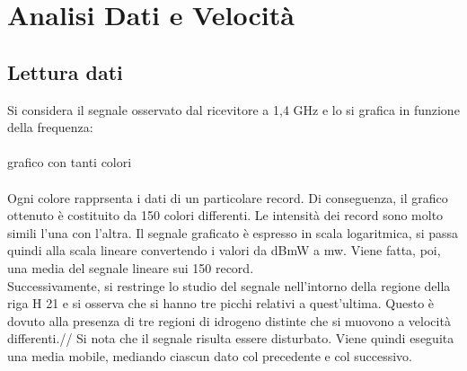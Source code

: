 \section{Analisi Dati e Velocità}
\label{Analisi Dati e Velocità}



\subsection{Lettura dati}
Si considera il segnale osservato dal ricevitore a 1,4 GHz e lo si grafica in funzione della frequenza:
\\\\
grafico con tanti colori
\\\\
Ogni colore rapprsenta i dati di un particolare record. Di conseguenza, il grafico ottenuto è costituito da 150 colori differenti. Le intensità dei record sono molto simili l'una con l'altra.
Il segnale graficato è espresso in scala logaritmica, si passa quindi alla scala lineare convertendo i valori da dBmW a mw. Viene fatta, poi, una media del segnale lineare sui 150 record.\\
Successivamente, si restringe lo studio del segnale nell'intorno della regione della riga H 21 e si osserva che si hanno tre picchi relativi a quest'ultima. Questo è dovuto alla presenza di tre regioni di idrogeno distinte che si muovono a velocità differenti.//  
Si nota che il segnale risulta essere disturbato. Viene quindi eseguita una media mobile, mediando ciascun dato col precedente e col successivo.



